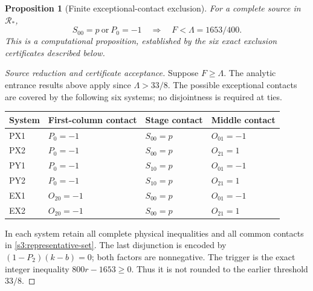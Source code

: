 \documentclass[11pt,reqno]{amsart}
\newtheorem{proposition}[theorem]{Proposition}
\theoremstyle{definition}
\theoremstyle{remark}
\begin{document}
\begin{proposition}[Finite exceptional-contact exclusion]
\label{s3:exceptional-finite}
For a complete source in \(\mathcal R_*\),
\[
 S_{00}=p\ \text{or}\ P_0=-1
 \quad\Longrightarrow\quad F<\Lambda=1653/400.
\]
This is a computational proposition, established by the six exact
exclusion certificates described below.
\end{proposition}

\begin{proof}[Source reduction and certificate acceptance]
Suppose \(F\ge\Lambda\). The analytic entrance results above apply
since \(\Lambda>33/8\). The possible exceptional contacts are covered
by the following six systems; no disjointness is required at ties.
\begin{center}
\begin{tabular}{@{}llll@{}}
\toprule
System&First-column contact&Stage contact&Middle contact\\
\midrule
PX1&\(P_0=-1\)&\(S_{00}=p\)&\(O_{01}=-1\)\\
PX2&\(P_0=-1\)&\(S_{00}=p\)&\(O_{21}=1\)\\
PY1&\(P_0=-1\)&\(S_{10}=p\)&\(O_{01}=-1\)\\
PY2&\(P_0=-1\)&\(S_{10}=p\)&\(O_{21}=1\)\\
EX1&\(O_{20}=-1\)&\(S_{00}=p\)&\(O_{01}=-1\)\\
EX2&\(O_{20}=-1\)&\(S_{00}=p\)&\(O_{21}=1\)\\
\bottomrule
\end{tabular}
\end{center}
In each system retain all complete physical inequalities and all
common contacts in \eqref{s3:representative-set}. The last disjunction
is encoded by \((1-P_2)(k-b)=0\); both factors are nonnegative.
The trigger is the exact integer inequality \(800r-1653\ge0\).
Thus it is not rounded to the earlier threshold \(33/8\).


\end{proof}
\end{document}

